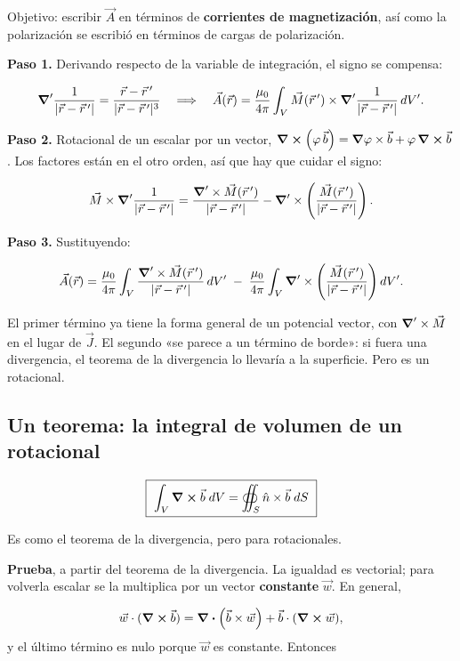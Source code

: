 \documentclass[12pt,a4paper]{article}
\begin{document}
Objetivo: escribir $\vec A$ en términos de \textbf{corrientes de magnetización}, así
como la polarización se escribió en términos de cargas de polarización.

\textbf{Paso 1.} Derivando respecto de la variable de integración, el signo se
compensa:

\[
\vnabla'\frac{1}{|\vec r-\vec r\,'|} = \frac{\vec r-\vec r\,'}{|\vec r-\vec r\,'|^3}
\quad\Longrightarrow\quad
\vec A(\vec r) = \frac{\mu_0}{4\pi}\int_V \vec M(\vec r\,')\times
\vnabla'\frac{1}{|\vec r-\vec r\,'|}\,dV' .
\]

\textbf{Paso 2.} Rotacional de un escalar por un vector,
$\curl (\varphi\,\vec b) = \vnabla\varphi\times\vec b + \varphi\,\curl \vec b$.
Los factores están en el otro orden, así que hay que cuidar el signo:

\[
\vec M\times\vnabla'\frac{1}{|\vec r-\vec r\,'|}
= \frac{\vnabla'\times\vec M(\vec r\,')}{|\vec r-\vec r\,'|}
- \vnabla'\times\left(\frac{\vec M(\vec r\,')}{|\vec r-\vec r\,'|}\right).
\]

\textbf{Paso 3.} Sustituyendo:

\[
\vec A(\vec r) = \frac{\mu_0}{4\pi}\int_V
\frac{\vnabla'\times\vec M(\vec r\,')}{|\vec r-\vec r\,'|}\,dV'
\;-\; \frac{\mu_0}{4\pi}\int_V
\vnabla'\times\left(\frac{\vec M(\vec r\,')}{|\vec r-\vec r\,'|}\right)dV' .
\]

El primer término ya tiene la forma general de un potencial vector, con
$\vnabla'\times\vec M$ en el lugar de $\vec J$. El segundo «se parece a un
término de borde»: si fuera una divergencia, el teorema de la divergencia lo
llevaría a la superficie. Pero es un rotacional.

\subsection{Un teorema: la integral de volumen de un rotacional}

\begin{keybox}
\[
\boxed{\ \int_V \curl \vec b\;dV = \oiint_S \hat n\times\vec b\;dS\ }
\]
\end{keybox}

Es como el teorema de la divergencia, pero para rotacionales.

\textbf{Prueba}, a partir del teorema de la divergencia. La igualdad es vectorial;
para volverla escalar se la multiplica por un vector \textbf{constante} $\vec w$. En
general,

\[
\vec w\cdot(\curl \vec b) = \div (\vec b\times\vec w) + \vec b\cdot(\curl \vec w),
\]
y el último término es nulo porque $\vec w$ es constante. Entonces
\end{document}
